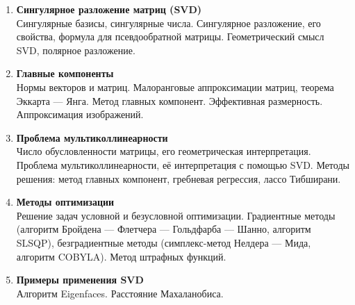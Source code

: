 \documentclass[12pt,oneside,openany]{article}
\begin{document}
\begin{enumerate}
  \item \textbf{Сингулярное разложение матриц (SVD)} \\
  Сингулярные базисы, сингулярные числа. Сингулярное разложение, его свойства, формула для псевдообратной матрицы. Геометрический смысл SVD, полярное разложение.

  \item \textbf{Главные компоненты} \\
  Нормы векторов и матриц. Малоранговые аппроксимации матриц, теорема Эккарта --- Янга. Метод главных компонент. Эффективная размерность. Аппроксимация изображений.

  \item \textbf{Проблема мультиколлинеарности} \\
  Число обусловленности матрицы, его геометрическая интерпретация. Проблема мультиколлинеарности, её интерпретация с помощью SVD. Методы решения: метод главных компонент, гребневая регрессия, лассо Тибширани.

  \item \textbf{Методы оптимизации} \\
  Решение задач условной и безусловной оптимизации. Градиентные методы (алгоритм Бройдена --- Флетчера --- Гольдфарба --- Шанно, алгоритм SLSQP), безградиентные методы (симплекс-метод Нелдера --- Мида, алгоритм COBYLA). Метод штрафных функций.

  \item \textbf{Примеры применения SVD} \\
  Алгоритм Eigenfaces. Расстояние Махаланобиса.

\end{enumerate}
\end{document}
